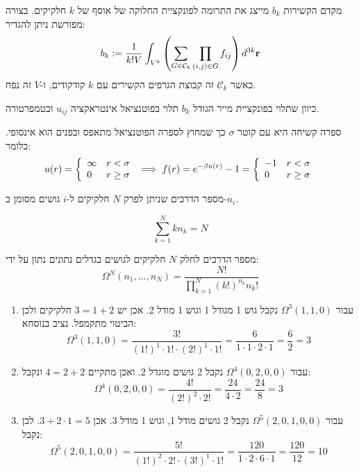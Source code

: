 \documentclass{tstextbook}
\begin{document}
\begin{definition}
מקדם הקשירות \(b_{k}\) מייצג את התרומה לפונקציית החלוקה של אוסף של \(k\) חלקיקים. בצורה מפורשת ניתן להגדיר:
$$b_{k}:=\frac{1}{k!V}\int_{V^{k}}\left(\sum_{G\in{\mathcal{C}}_{k}}\prod_{(i,j)\in G}f_{i j}\right)d^{3k}{\bf r}$$
כאשר \(\mathcal{C}_{k}\) זה קבוצת הגרפים הקשירים עם \(k\) קודקודים, ו-\(V\) זה נפח.

\end{definition}
\begin{remark}
כיוון שתלוי בפונקציית מייר הגודל \(b_{k}\) תלוי בפוטנציאל אינטראקציה \(u_{ij}\) ובטמפרטורה.

\end{remark}
\begin{example}
ספרה קשיחה היא עם קוטר \(\sigma\) כך שמחוץ לספרה הפוטנציאל מתאפס ובפנים הוא אינסופי. כלומר:
$$u(r)=\left\{{\begin{array}{l l}{\infty}&{r<\sigma}\\ {0}&{r\geq\sigma}\end{array}}\right.\implies f(r)=e^{-\beta u(r)}-1={\left\{\begin{array}{l l}{-1}&{r<\sigma}\\ {0}&{r\geq\sigma}\end{array}\right.}$$

\end{example}
\begin{symbolize}
מספר הדרכים שניתן לפרק \(N\) חלקיקים ל-\(i\) גושים מסומן ב-\(n_{i}\).

\end{symbolize}
\begin{corollary}
$$\sum_{k=1}^{N}k n_{k}=N$$

\end{corollary}
\begin{corollary}
מספר הדרכים לחלק \(N\) חלקיקים לגושים בגדלים נתונים נתון על ידי:
$$\Omega^{N}(n_{1},...,n_{N})=\frac{N!}{\prod_{k=1}^{N}(k!)^{n_{k}}n_{k}!}$$

\end{corollary}
\begin{example}
  \begin{enumerate}
    \item עבור \(\Omega^{3}(1,1,0)\) נקבל גוש 1 מגודל 1 וגוש 1 מודל 2. אכן יש \(3=1+2\) חלקיקים ולכן הביטוי מתקמפל. נציב בנוסחא: 
$$\Omega^{3}(1,1,0)=\frac{3!}{(1!)^{1}\cdot1!\cdot(2!)^{1}\cdot1!}=\frac{6}{1\cdot1\cdot2\cdot1}=\frac{6}{2}=3$$


    \item עבור \(\Omega^{4}(0,2,0,0)\) נקבל 2 גושים מוגדל 2. ואכן מתקיים \(4=2+2\) ונקבל: 
$$\Omega^{4}(0,2,0,0)=\frac{4!}{(2!)^{2}\cdot2!}=\frac{24}{4\cdot2}=\frac{24}{8}=3$$


    \item עבור \(\Omega^{5}(2,0,1,0,0)\) נקבל 2 גושים מודל 1, וגוש 1 מודל 3. אכן \(3+2\cdot 1 = 5\). לכן נקבל: 
$$\Omega^{5}(2,0,1,0,0)=\frac{5!}{(1!)^{2}\cdot2!\cdot(3!)^{1}\cdot1!}=\frac{120}{1\cdot2\cdot6\cdot1}=\frac{120}{12}=10$$


  \end{enumerate}
\end{example}
\end{document}
